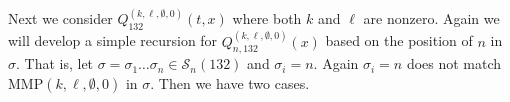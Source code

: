 \documentclass[
final,nomarks
]{dmtcs-episciences}
\newcommand{\Sn}[1]{\mathcal{S}_{#1}}
\newcommand{\Qmm}[1]{Q_{132}^{(#1)}(t,x)}
\newcommand{\Qmmn}[2]{Q_{#2,132}^{(#1)}(x)}
\newcommand{\MMP}{\mathrm{MMP}}
\begin{document}
Next we consider \begin{math}\Qmm{k,\ell,\emptyset,0}\end{math} where both \begin{math}k\end{math} and \begin{math}\ell\end{math} are nonzero. 
Again we will develop a simple recursion for \begin{math}\Qmmn{k,\ell,\emptyset,0}{n}\end{math} based on the position of \begin{math}n\end{math} 
in \begin{math}\sigma\end{math}.  That is, let \begin{math}\sigma = \sigma_1 \ldots \sigma_n \in\Sn{n}(132)\end{math} and \begin{math}\sigma_i=n\end{math}. 
Again \begin{math}\sigma_i =n\end{math} does not match \begin{math}\MMP(k,\ell,\emptyset,0)\end{math} in \begin{math}\sigma\end{math}.  Then we have two cases. 
\end{document}
